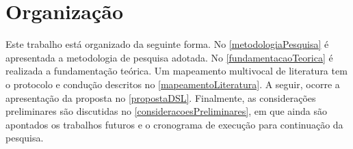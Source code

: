 \section{Organização}

Este trabalho está organizado da seguinte forma. 
No \autoref{metodologiaPesquisa} é apresentada a metodologia de pesquisa adotada. 
No \autoref{fundamentacaoTeorica} é realizada a fundamentação teórica. Um mapeamento multivocal de literatura tem o protocolo e condução descritos no \autoref{mapeamentoLiteratura}. 
A seguir, ocorre a apresentação da proposta no \autoref{propostaDSL}. 
Finalmente, as considerações preliminares são discutidas no \autoref{consideracoesPreliminares}, em que ainda são apontados os trabalhos futuros e o cronograma de execução para continuação da pesquisa.